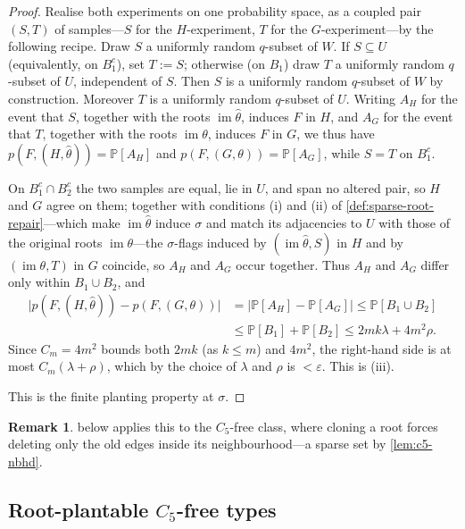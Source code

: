 \documentclass[11pt]{article}
\theoremstyle{definition}
\newtheorem{remark}[remark]{Remark}
\newcommand{\Prob}{\mathbb{P}}
\newcommand{\eps}{\varepsilon}
\begin{document}
\begin{proof}
Realise both experiments on one probability space, as a coupled pair $(S,T)$ of samples---$S$
for the $H$-experiment, $T$ for the $G$-experiment---by the following recipe.  Draw $S$ a
uniformly random $q$-subset of $W$.  If $S\subseteq U$ (equivalently, on $B_1^c$), set
$T:=S$; otherwise (on $B_1$) draw $T$ a uniformly random $q$-subset of $U$, independent of
$S$.  Then $S$ is a uniformly random $q$-subset of $W$ by construction.  Moreover $T$ is a
uniformly random $q$-subset of $U$. Writing $A_H$ for the event
that $S$, together with the roots $\operatorname{im}\widehat\theta$, induces $F$ in $H$, and
$A_G$ for the event that $T$, together with the roots $\operatorname{im}\theta$, induces $F$
in $G$, we thus have $p(F,(H,\widehat\theta))=\Prob[A_H]$ and $p(F,(G,\theta))=\Prob[A_G]$,
while $S=T$ on $B_1^c$.

On $B_1^c\cap B_2^c$ the two samples are equal, lie in $U$, and span no altered pair, so $H$
and $G$ agree on them; together with conditions (i) and (ii) of
\cref{def:sparse-root-repair}---which make $\operatorname{im}\widehat\theta$ induce $\sigma$
and match its adjacencies to $U$ with those of the original roots
$\operatorname{im}\theta$---the $\sigma$-flags induced by $(\operatorname{im}\widehat\theta,S)$
in $H$ and by $(\operatorname{im}\theta,T)$ in $G$ coincide, so $A_H$ and $A_G$ occur
together.  Thus $A_H$ and $A_G$ differ only within $B_1\cup B_2$, and
\[
\begin{aligned}
  \bigl|p(F,(H,\widehat\theta))-p(F,(G,\theta))\bigr|
  &=\bigl|\Prob[A_H]-\Prob[A_G]\bigr|
  \le\Prob[B_1\cup B_2]\\
  &\le\Prob[B_1]+\Prob[B_2]
  \le 2mk\lambda+4m^2\rho .
\end{aligned}
\]
Since $C_m=4m^2$ bounds both $2mk$ (as $k\le m$) and $4m^2$, the right-hand side is at most
$C_m(\lambda+\rho)$, which by the choice of $\lambda$ and $\rho$ is $<\eps$.  This is (iii).

This is the finite planting property at $\sigma$.
\end{proof}

\begin{remark}
 below applies this to the $C_5$-free class, where cloning a root forces
deleting only the old edges inside its neighbourhood---a sparse set by \cref{lem:c5-nbhd}.
\end{remark}

\subsection{Root-plantable \texorpdfstring{$C_5$}{C5}-free types}
\label{subsec:c5-planting}
\end{document}
